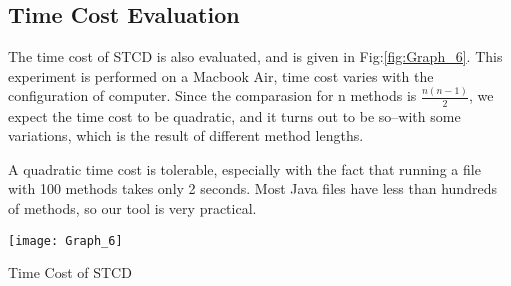 \documentclass[../main.tex]{subfiles}
\begin{document}
\subsection{Time Cost Evaluation}

The time cost of STCD is also evaluated, and is given in Fig:\ref{fig:Graph_6}. This experiment is performed on a Macbook Air, time cost varies with the configuration of computer. Since the comparasion for n methods is $\frac{n(n-1)}{2}$, we expect the time cost to be quadratic, and it turns out to be so--with some variations, which is the result of different method lengths.

A quadratic time cost is tolerable, especially with the fact that running a file with 100 methods takes only 2 seconds. Most Java files have less than hundreds of methods, so our tool is very practical.

\begin{figurehere}
\centering \texttt{[image: Graph\_6]} 
\caption{Time Cost of STCD} \label{fig:Graph_6}
\end{figurehere}
\end{document}
